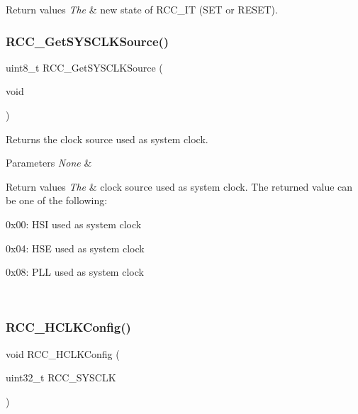 \begin{DoxyRetVals}{Return values}
{\em The} & new state of R\+C\+C\+\_\+\+IT (S\+ET or R\+E\+S\+ET). \\
\hline
\end{DoxyRetVals}
\mbox{\label{group___r_c_c___private___functions_gaaeb32311c208b2a980841c9c884a41ea}} 
\subsubsection{\texorpdfstring{RCC\_GetSYSCLKSource()}{RCC\_GetSYSCLKSource()}}
{\footnotesize\ttfamily uint8\+\_\+t R\+C\+C\+\_\+\+Get\+S\+Y\+S\+C\+L\+K\+Source (\begin{DoxyParamCaption}\item[{void}]{ }\end{DoxyParamCaption})}



Returns the clock source used as system clock. 


\begin{DoxyParams}{Parameters}
{\em None} & \\
\hline
\end{DoxyParams}

\begin{DoxyRetVals}{Return values}
{\em The} & clock source used as system clock. The returned value can be one of the following\+:
\begin{DoxyItemize}
\item 0x00\+: H\+SI used as system clock
\item 0x04\+: H\+SE used as system clock
\item 0x08\+: P\+LL used as system clock 
\end{DoxyItemize}\\
\hline
\end{DoxyRetVals}
\mbox{\label{group___r_c_c___private___functions_ga9d0aec72e236c6cdf3a3a82dfb525491}} 
\subsubsection{\texorpdfstring{RCC\_HCLKConfig()}{RCC\_HCLKConfig()}}
{\footnotesize\ttfamily void R\+C\+C\+\_\+\+H\+C\+L\+K\+Config (\begin{DoxyParamCaption}\item[{uint32\+\_\+t}]{R\+C\+C\+\_\+\+S\+Y\+S\+C\+LK }\end{DoxyParamCaption})}




